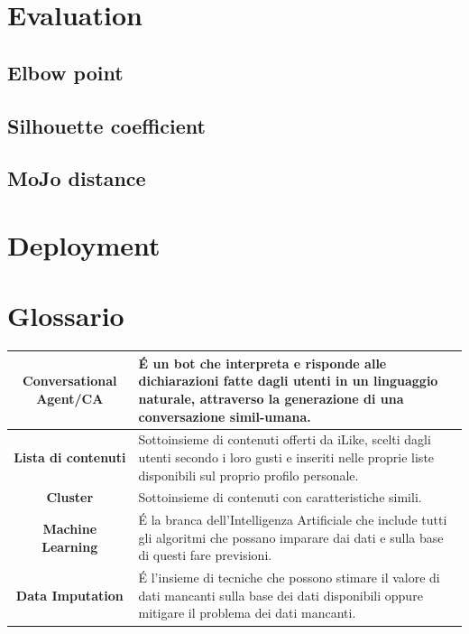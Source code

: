 \documentclass[a4paper, 12pt]{report}
\begin{document}
    \chapter{Evaluation}\label{ch:evaluation}


        \section{Elbow point}\label{sec:elbow-point}


        \section{Silhouette coefficient}\label{sec:silhouette-coefficient}


        \section{MoJo distance}\label{sec:mojo-distance}


    \chapter{Deployment}\label{ch:deployment}


    \chapter{Glossario}\label{ch:glossario}
        \begin{adjustbox}{width=\columnwidth,center}
            \begin{tabular}{|>{\columncolor{Goldenrod}}c|p{10cm}|}
                \hline \textbf{Conversational Agent/CA} & É un bot che interpreta e risponde alle dichiarazioni fatte dagli utenti
                in un linguaggio naturale, attraverso la  generazione di una conversazione simil-umana.\\
                \hline \textbf{Lista di contenuti} & Sottoinsieme di contenuti offerti da iLike, scelti dagli utenti secondo i loro gusti
                e inseriti nelle proprie liste disponibili sul proprio profilo personale.\\
                \hline \textbf{Cluster} & Sottoinsieme di contenuti con caratteristiche simili.\\
                \hline \textbf{Machine Learning} & É la branca dell'Intelligenza Artificiale che include tutti gli algoritmi
                        che possano imparare dai dati e sulla base di questi fare previsioni.\\
                \hline \textbf{Data Imputation} & É l'insieme di tecniche che possono stimare il valore di dati mancanti
                        sulla base dei dati disponibili oppure mitigare il problema dei dati mancanti.\\
                \hline
            \end{tabular}
        \end{adjustbox}
\end{document}
